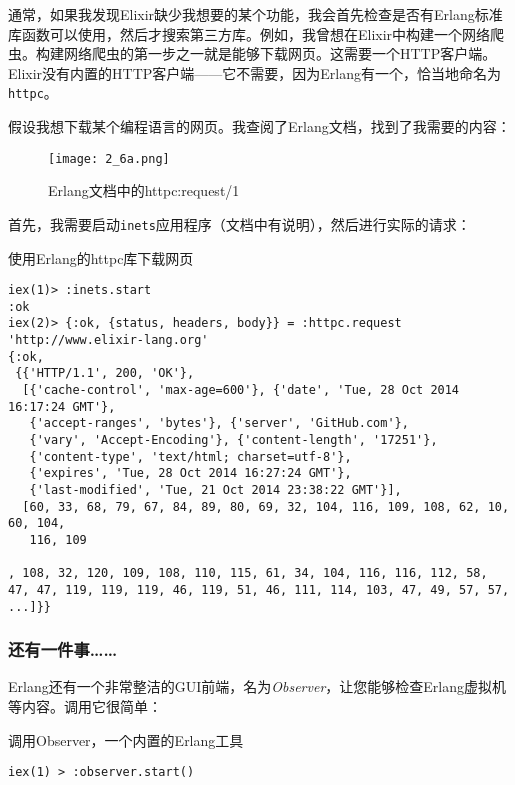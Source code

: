 通常，如果我发现Elixir缺少我想要的某个功能，我会首先检查是否有Erlang标准库函数可以使用，然后才搜索第三方库。例如，我曾想在Elixir中构建一个网络爬虫。构建网络爬虫的第一步之一就是能够下载网页。这需要一个HTTP客户端。Elixir没有内置的HTTP客户端------它不需要，因为Erlang有一个，恰当地命名为\texttt{httpc}。

假设我想下载某个编程语言的网页。我查阅了Erlang文档，找到了我需要的内容：

\begin{figure}[!ht]
    \centering
    \texttt{[image: 2\_6a.png]}
    \caption{Erlang文档中的httpc:request/1}
    \label{fig:2_6a}
\end{figure}

首先，我需要启动\texttt{inets}应用程序（文档中有说明），然后进行实际的请求：


\begin{code}{使用Erlang的httpc库下载网页}
\begin{verbatim}
iex(1)> :inets.start
:ok
iex(2)> {:ok, {status, headers, body}} = :httpc.request 'http://www.elixir-lang.org'
{:ok,
 {{'HTTP/1.1', 200, 'OK'},
  [{'cache-control', 'max-age=600'}, {'date', 'Tue, 28 Oct 2014 16:17:24 GMT'},
   {'accept-ranges', 'bytes'}, {'server', 'GitHub.com'},
   {'vary', 'Accept-Encoding'}, {'content-length', '17251'},
   {'content-type', 'text/html; charset=utf-8'},
   {'expires', 'Tue, 28 Oct 2014 16:27:24 GMT'},
   {'last-modified', 'Tue, 21 Oct 2014 23:38:22 GMT'}],
  [60, 33, 68, 79, 67, 84, 89, 80, 69, 32, 104, 116, 109, 108, 62, 10, 60, 104,
   116, 109

, 108, 32, 120, 109, 108, 110, 115, 61, 34, 104, 116, 116, 112, 58, 47, 47, 119, 119, 119, 46, 119, 51, 46, 111, 114, 103, 47, 49, 57, 57, ...]}}
\end{verbatim}
\label{lst:downloading_a_web_page_with_erlangs_httpc_library}
\end{code}


\subsubsection{还有一件事\ldots\ldots{}}

Erlang还有一个非常整洁的GUI前端，名为\emph{Observer}，让您能够检查Erlang虚拟机等内容。调用它很简单：

\begin{code}{调用Observer，一个内置的Erlang工具}
\begin{verbatim}
iex(1) > :observer.start()
\end{verbatim}
\label{lst:use_erlang_observer}
\end{code}

